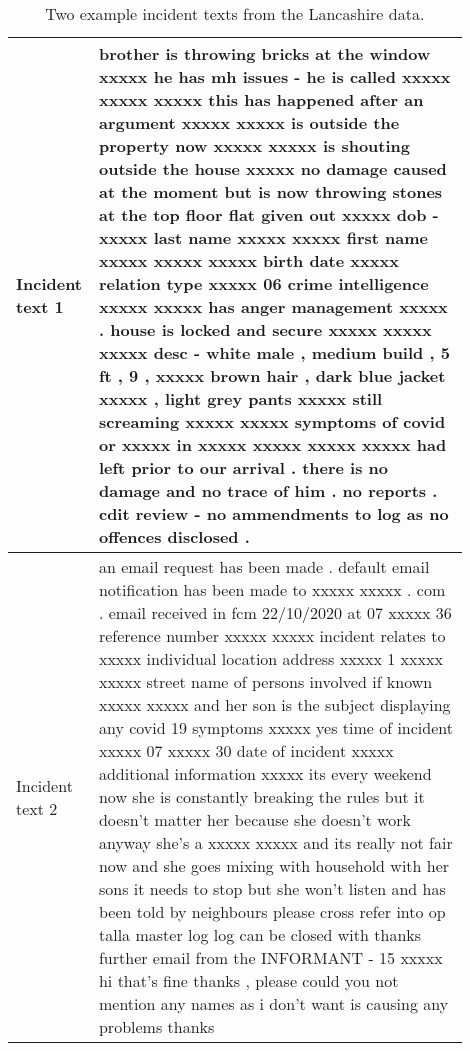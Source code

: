 \begin{table}[]
\centering
\begin{tabular}{p{0.1\linewidth}p{0.8\linewidth}}

\toprule
Incident text 1 &  brother is throwing bricks at the window xxxxx he has mh issues - he is called xxxxx xxxxx xxxxx this has happened after an argument xxxxx xxxxx is outside the property now xxxxx xxxxx is shouting outside the house xxxxx no damage caused at the moment but is now throwing stones at the top floor flat given out xxxxx dob - xxxxx last name xxxxx xxxxx first name xxxxx xxxxx xxxxx birth date xxxxx relation type xxxxx 06 crime intelligence xxxxx xxxxx has anger management xxxxx . house is locked and secure xxxxx xxxxx xxxxx desc - white male , medium build , 5 ft , 9 , xxxxx brown hair , dark blue jacket xxxxx , light grey pants xxxxx still screaming xxxxx xxxxx symptoms of covid or xxxxx in xxxxx xxxxx xxxxx xxxxx had left prior to our arrival . there is no damage and no trace of him . no reports . cdit review - no ammendments to log as no offences disclosed .                                                             \\ \midrule
Incident text 2 & an email request has been made . default email notification has been made to xxxxx xxxxx . com . email received in fcm 22/10/2020 at 07 xxxxx 36 reference number xxxxx xxxxx incident relates to xxxxx individual location address xxxxx 1 xxxxx xxxxx street name of persons involved if known xxxxx xxxxx and her son is the subject displaying any covid 19 symptoms xxxxx yes time of incident xxxxx 07 xxxxx 30 date of incident xxxxx additional information xxxxx its every weekend now she is constantly breaking the rules but it doesn't matter her because she doesn't work anyway she's a xxxxx xxxxx and its really not fair now and she goes mixing with household with her sons it needs to stop but she won't listen and has been told by neighbours please cross refer into op talla master log log can be closed with thanks further email from the INFORMANT - 15 xxxxx hi that's fine thanks , please could you not mention any names as i don't want is causing any problems thanks \\ \bottomrule
\end{tabular}
\caption[ASB Incident Log Examples]{\label{tab:example_incident} Two example incident texts from the Lancashire data.}
\end{table}




